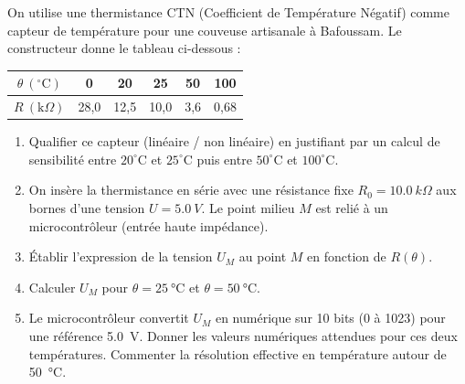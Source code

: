\documentclass[11pt]{article}
\begin{document}
\begin{exercice}
On utilise une thermistance CTN (Coefficient de Température Négatif) comme capteur de température pour une couveuse artisanale à Bafoussam. Le constructeur donne le tableau ci-dessous :
\begin{center}
\begin{tabular}{|c|c|c|c|c|c|}
\hline
$\theta\ (^{\circ}\mathrm{C})$ & 0 & 20 & 25 & 50 & 100 \\
\hline
$R\ (\mathrm{k}\Omega)$ & 28,0 & 12,5 & 10,0 & 3,6 & 0,68 \\
\hline
\end{tabular}
\end{center}
\begin{enumerate}
    \item Qualifier ce capteur (linéaire / non linéaire) en justifiant par un calcul de sensibilité entre $20^{\circ}\mathrm{C}$ et $25^{\circ}\mathrm{C}$ puis entre $50^{\circ}\mathrm{C}$ et $100^{\circ}\mathrm{C}$.
    \item On insère la thermistance en série avec une résistance fixe $R_0 = \SI{10,0}{k\Omega}$ aux bornes d'une tension $U = \SI{5,0}{V}$. Le point milieu $M$ est relié à un microcontrôleur (entrée haute impédance).
    \item Établir l'expression de la tension $U_M$ au point $M$ en fonction de $R(\theta)$.
    \item Calculer $U_M$ pour $\theta = \SI{25}{\celsius}$ et $\theta = \SI{50}{\celsius}$.
    \item Le microcontrôleur convertit $U_M$ en numérique sur 10 bits (0 à 1023) pour une référence \SI{5,0}{V}. Donner les valeurs numériques attendues pour ces deux températures. Commenter la résolution effective en température autour de \SI{50}{\celsius}.
\end{enumerate}
\end{exercice}
\end{document}
